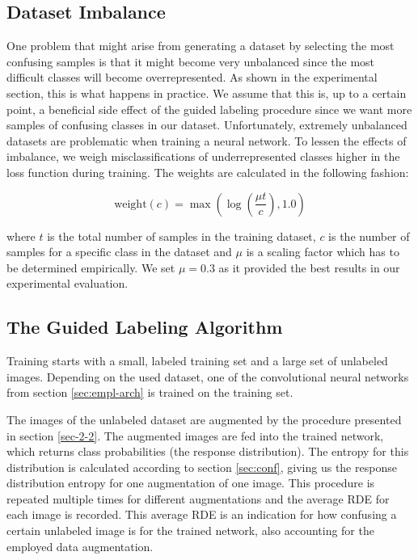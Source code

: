 \documentclass[10pt,twocolumn,letterpaper]{article}
\begin{document}
\subsection{Dataset Imbalance}
\label{sec-2-5}
One problem that might arise from generating a dataset by selecting
the most confusing samples is that it might become very unbalanced
since the most difficult classes will become overrepresented. As shown
in the experimental section, this is what happens in practice. We
assume that this is, up to a certain point, a beneficial side effect
of the guided labeling procedure since we want more samples of
confusing classes in our dataset. Unfortunately, extremely unbalanced
datasets are problematic when training a neural network. To lessen the
effects of imbalance, we weigh misclassifications of underrepresented
classes higher in the loss function during training. The weights are
calculated in the following fashion:

\begin{equation}
  \label{eq:2}
  \text{weight}(c) = \max\left(\log\left(\frac{\mu t}{c}\right), 1.0\right)
\end{equation}

where $t$ is the total number of samples in the training dataset, $c$
is the number of samples for a specific class in the dataset and $\mu$
is a scaling factor which has to be determined empirically. We set
$\mu = 0.3$ as it provided the best results in our experimental
evaluation.

\subsection{The Guided Labeling Algorithm}
\label{sec-2-4}
Training starts with a small, labeled training set and a large set of
unlabeled images. Depending on the used dataset, one of the
convolutional neural networks from section \ref{sec:empl-arch} is
trained on the training set.

The images of the unlabeled dataset are augmented by the procedure
presented in section \ref{sec-2-2}. The augmented images are fed into
the trained network, which returns class probabilities (\ie the
response distribution). The entropy for this distribution is
calculated according to section \ref{sec:conf}, giving us the response
distribution entropy for one augmentation of one image. This procedure
is repeated multiple times for different augmentations and the average
RDE for each image is recorded. This average RDE is an indication for
how confusing a certain unlabeled image is for the trained network,
also accounting for the employed data augmentation.
\end{document}
